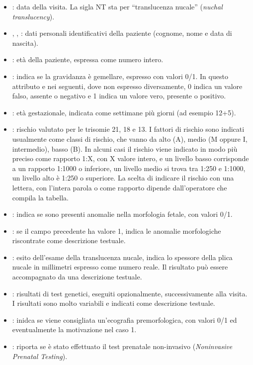 \begin{itemize}
\item {}: data della visita. La sigla NT sta per \enquote{translucenza nucale} (\emph{nuchal translucency}).
\item {}, , : dati personali identificativi della paziente (cognome, nome e data di nascita).
\item {}: età della paziente, espressa come numero intero.
\item {}: indica se la gravidanza è gemellare, espresso con valori 0/1.
In questo attributo e nei seguenti, dove non espresso diversamente, 0 indica un valore falso, assente o negativo e 1 indica un valore vero, presente o positivo.
\item {}: età gestazionale, indicata come settimane più giorni (ad esempio 12+5).
\item {}: rischio valutato per le trisomie 21, 18 e 13.
I fattori di rischio sono indicati usualmente come classi di rischio, che vanno da alto (A), medio (M oppure I, intermedio), basso (B).
In alcuni casi il rischio viene indicato in modo più preciso come rapporto 1:X, con X valore intero, e un livello basso corrisponde a un rapporto 1:1000 o inferiore, un livello medio si trova tra 1:250 e 1:1000, un livello alto è 1:250 o superiore.
La scelta di indicare il rischio con una lettera, con l'intera parola o come rapporto dipende dall'operatore che compila la tabella.
\item {}: indica se sono presenti anomalie nella morfologia fetale, con valori 0/1.
\item {}: se il campo precedente ha valore 1, indica le anomalie morfologiche riscontrate come descrizione testuale.
\item {}: esito dell'esame della translucenza nucale, indica lo spessore della plica nucale in millimetri espresso come numero reale. Il risultato può essere accompagnato da una descrizione testuale.
\item {}: risultati di test genetici, eseguiti opzionalmente, successivamente alla visita. I risultati sono molto variabili e indicati come descrizione testuale.
\item {}: inidca se viene consigliata un'ecografia premorfologica, con valori 0/1 ed eventualmente la motivazione nel caso 1.
\item {}: riporta se è stato effettuato il test prenatale non-invasivo (\emph{Noninvasive Prenatal Testing}).

\end{itemize}
